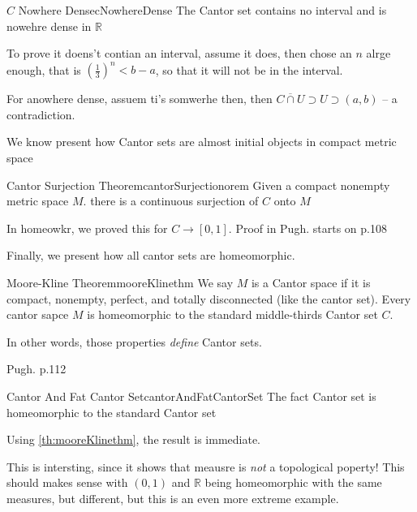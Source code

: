 \documentclass[oneside]{book}
\newcommand{\R}{\mathbb{R}}
\newcommand{\oln}{\overline}
\newcommand{\rw}{\rightarrow}
\begin{document}
\begin{prop}{$C$ Nowhere Dense}{cNowhereDense}
	The Cantor set contains no interval and is nowehre dense in $\R$
\end{prop}


\begin{Proof}
	To prove it doens't contian an interval, assume it does, then chose an $n$ alrge enough, that is $(\frac{1}{3})^n
	< b-a$, so that it will not be in the interval. 

	For anowhere dense, assuem ti's somwerhe then, then $\oln{C\cap U}\supset U \supset (a,b)$ -- a contradiction.
\end{Proof}


We know present how Cantor sets are almost initial objects in compact metric space

\begin{thm}{Cantor Surjection Theorem}{cantorSurjectionorem}
	Given a compact nonempty metric space $M$. there is a continuous surjection of $C$ onto $M$
\end{thm}

\begin{Proof}
	In homeowkr, we proved this for $C \rw [0,1]$. Proof in Pugh. starts on p.108
\end{Proof}

Finally, we present how all cantor sets are homeomorphic. 

\begin{thm}{Moore-Kline Theorem}{mooreKlinethm}
	We say $M$ is a Cantor space if it is compact, nonempty, perfect, and totally disconnected (like the cantor set). 
	Every cantor sapce $M$ is homeomorphic to the standard middle-thirds Cantor set $C$.

	In other words, those properties \emph{define} Cantor sets.

\end{thm}

\begin{Proof}
	Pugh. p.112
\end{Proof}

\begin{cor}{Cantor And Fat Cantor Set}{cantorAndFatCantorSet}
	The fact Cantor set is homeomorphic to the standard Cantor set
\end{cor}

\begin{Proof}
	Using \ref{th:mooreKlinethm}, the result is immediate.
\end{Proof}

This is intersting, since it shows that meausre is \emph{not} a topological poperty! This should makes sense with
$(0,1)$ and $\R$ being homeomorphic with the same measures, but different, but this is an even more extreme example. 
\end{document}
